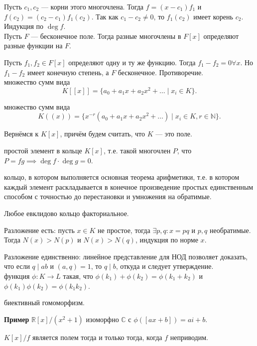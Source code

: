 \documentclass[12pt,a4paper]{article}
\begin{document}
\proof Пусть $c_1,c_2$ --- корни этого многочлена. Тогда $f=(x-c_1)f_1$ и $f(c_2)=(c_2-c_1)f_1(c_2)$. Так как $c_1-c_2\neq 0$, то $f_1(c_2)$ имеет корень $c_2$. Индукция по $\deg f$.\QEDA\\

\lemma Пусть $F$ --- бесконечное поле. Тогда разные многочлены в $F[x]$ определяют разные функции на $F$.

\proof Пусть $f_1,f_2\in F[x]$ определяют одну и ту же функцию. Тогда $f_1-f_2=0\forall x$. Но $f_1-f_2$ имеет конечную степень, а $F$ бесконечное. Противоречие. \QEDA\\

 множество сумм вида \[
	K[[x]]=\{a_0+a_1x+a_2x^2+\ldots \mid x_i\in K\}
.\]

 множество сумм вида \[
	K((x))=\{x^{-r}(a_0+a_1x+a_2x^2+\ldots) \mid x_i\in K,r\in \mathbb N\}
.\]

Вернёмся к $K[x]$, причём будем считать, что $K$ --- это поле. 

 простой элемент в кольце $K[x]$, т.е. такой многочлен $P$, что $P=fg\implies \deg f\cdot \deg g=0$.

 кольцо, в котором выполняется основная теорема арифметики, т.е. в котором каждый элемент раскладывается в конечное произведение простых единственным способом с точностью до перестановки и умножения на обратимые.

\lemma Любое евклидово кольцо факториальное.

\proof Разложение есть: пусть $x\in K$ не простое, тогда $\exists p,q:x=pq$ и $p,q$ необратимые. Тогда $N(x)>N(p)$ и $N(x)>N(q)$, индукция по норме $x$.

Разложение единственно: линейное представление для НОД позволяет доказать, что если $q\mid ab$ и $(a,q)=1$, то $q\mid b$, откуда и следует утверждение.\QEDA\\

 функция $\phi:K\to L$ такая, что $\phi(k_1)+\phi(k_2)=\phi(k_1+k_2)$ и $\phi(k_1)\phi(k_2)=\phi(k_1k_2)$.

 биективный гомоморфизм.

\textbf{Пример} $\mathbb R[x] /(x^2+1)$ изоморфно $\mathbb C$ с $\phi([ax+b])=ai+b$.

\newpage

\theorem $K[x] /f$ является полем тогда и только тогда, когда $f$ неприводим.
\end{document}
